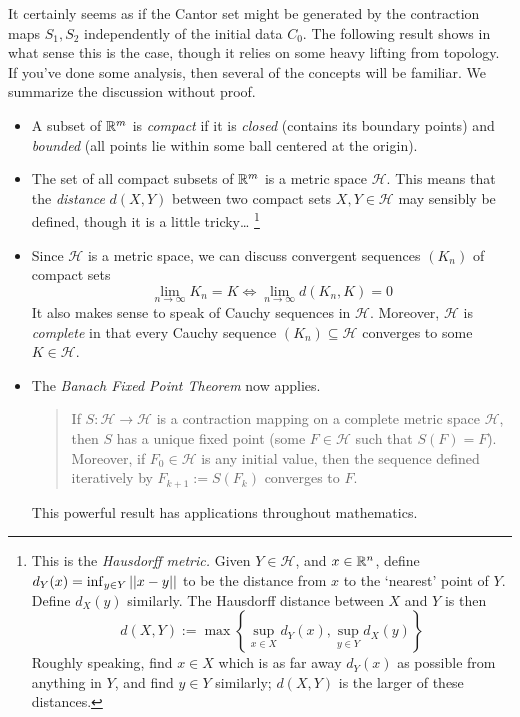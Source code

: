 \goodbreak



It certainly seems as if the Cantor set might be generated by the contraction maps $S_1,S_2$ independently of the initial data $C_0$. The following result shows in what sense this is the case, though it relies on some heavy lifting from topology. If you've done some analysis, then several of the concepts will be familiar. We summarize the discussion without proof.

\begin{itemize}
  \item A subset of $\mathbb{R}^m$ is \emph{compact} if it is \emph{closed} (contains its boundary points) and \emph{bounded} (all points lie within some ball centered at the origin).
  
  \item The set of all compact subsets of $\mathbb{R}^m$ is a metric space $\mathcal H$. This means that the \emph{distance} $d(X,Y)$ between two compact sets $X,Y\in\mathcal H$ may sensibly be defined, though it is a little tricky\ldots%
  \footnote{%
  	This is the \emph{Hausdorff metric.} Given $Y\in\mathcal H$, and $x\in \mathbb{R}^n$, define $d_Y(x)=\inf_{y\in Y}\left| \left| x-y\right|\right|$ to be the distance from $x$ to the `nearest' point of $Y$. Define $d_X(y)$ similarly. The Hausdorff distance between $X$ and $Y$ is then
  	\[
  		d(X,Y):=\max\left\{\sup_{x\in X}d_Y(x),\sup_{y\in Y}d_X(y)\right\}
  	\]
  	Roughly speaking, find $x\in X$ which is as far away $d_Y(x)$ as possible from anything in $Y$, and find $y\in Y$ similarly; $d(X,Y)$ is the larger of these distances.
  }
  
  \item Since $\mathcal H$ is a metric space, we can discuss convergent sequences $(K_n)$ of compact sets
	\[
		\lim_{n\to\infty}K_n=K\iff \lim_{n\to\infty}d(K_n,K)=0
	\]
	It also makes sense to speak of Cauchy sequences in $\mathcal H$. Moreover, $\mathcal H$ is \emph{complete} in that every Cauchy sequence $(K_n)\subseteq\mathcal H$ converges to some $K\in\mathcal H$.
	
  \item The \emph{Banach Fixed Point Theorem} now applies.
	\begin{quote}
	  If $S:\mathcal H\to\mathcal H$ is a contraction mapping on a complete metric space $\mathcal H$, then $S$ has a unique fixed point (some $F\in\mathcal H$ such that $S(F)=F$). Moreover, if $F_0\in\mathcal H$ is any initial value, then the sequence defined iteratively by $F_{k+1}:=S(F_k)$ converges to $F$.
	\end{quote}
  This powerful result has applications throughout mathematics.
\end{itemize}


